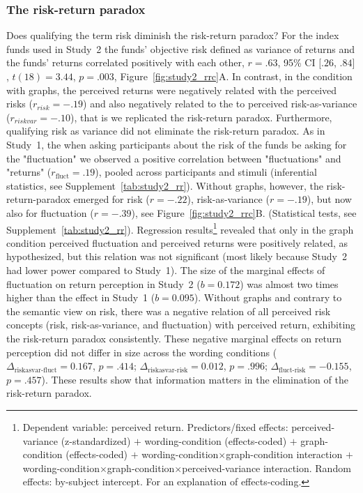 \documentclass[a4paper,man, natbib,floatsintext]{apa6} %
\begin{document}
\subsubsection{The risk-return paradox}
Does qualifying the term risk diminish the risk-return paradox? For the index funds used in Study~2 the funds' objective risk defined as variance of returns and the funds' returns correlated positively with each other, $r = .63$, 95\% CI $[.26$, $.84]$, $t(18) = 3.44$, $p = .003$, Figure~\ref{fig:study2_rrc}A. In contrast, in the condition with graphs, the perceived returns were negatively related with the perceived risks  ($r_{risk} = -.19$) and also negatively related to the to perceived risk-as-variance ($r_{riskvar}=-.10$), that is we replicated the risk-return paradox. Furthermore, qualifying risk as variance did not eliminate the risk-return paradox. As in Study~1, the when asking participants about the risk of the funds be asking for the "fluctuation" we observed a positive correlation between "fluctuations" and "returns" ($r_{\text{fluct}} = .19$), pooled across participants and stimuli (inferential statistics, see Supplement~\ref{tab:study2_rr}). Without graphs, however, the risk-return-paradox emerged for risk ($r = -.22$), risk-as-variance ($r= -.19$), but now also for fluctuation ($r=-.39$), see Figure~\ref{fig:study2_rrc}B. (Statistical tests, see Supplement~\ref{tab:study2_rr}).  Regression results\footnote{Dependent variable: perceived return. Predictors/fixed effects: perceived-variance (z-standardized) $+$ wording-condition (effects-coded) $+$ graph-condition (effects-coded) $+$ wording-condition$\times$graph-condition interaction $+$ wording-condition$\times$graph-condition$\times$perceived-variance interaction. Random effects: by-subject intercept. For an explanation of effects-coding.} revealed that only in the graph condition perceived fluctuation and perceived returns were positively related, as hypothesized, but this relation was not significant (most likely because Study~2 had lower power compared to Study~1). The size of the marginal effects of fluctuation on return perception in Study~2 ($b=0.172$) was almost two times higher than the effect in Study~1 ($b=0.095$). Without graphs and contrary to the semantic view on risk, there was a negative relation of all perceived risk concepts (risk, risk-as-variance, and fluctuation) with perceived return, exhibiting the risk-return paradox consistently. These negative marginal effects on return perception did not differ in size across the wording conditions ($\Delta_{\text{riskasvar-fluct}}=0.167$, $p=.414$; $\Delta_{\text{riskasvar-risk}}=0.012$, $p=.996$; $\Delta_{\text{fluct-risk}}=-0.155$, $p=.457$). These results show that information matters in the elimination of the risk-return paradox.
\end{document}
